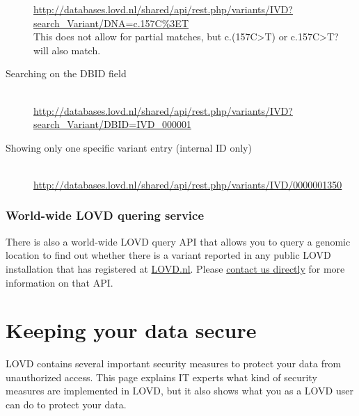 \documentclass[a4paper,oneside,openany,12pt]{memoir}
\begin{document}
\begin{description}
  \href{http://databases.lovd.nl/shared/api/rest.php/variants/IVD?search_Variant/DNA=c.157C\%3ET}
       {http://databases.lovd.nl/shared/api/rest.php/variants/IVD?\\
       \phantom{..........}search\_Variant/DNA=c.157C\%3ET}\\
       This does not allow for partial matches, but c.(157C>T) or c.157C>T? will also match.
  \item[Searching on the DBID field]\hfill \\
  \href{http://databases.lovd.nl/shared/api/rest.php/variants/IVD?search_Variant/DBID=IVD_000001}
       {http://databases.lovd.nl/shared/api/rest.php/variants/IVD?\\
       \phantom{..........}search\_Variant/DBID=IVD\_000001}
  \item[Showing only one specific variant entry (internal ID only)]\hfill \\
  \href{http://databases.lovd.nl/shared/api/rest.php/variants/IVD/0000001350}
       {http://databases.lovd.nl/shared/api/rest.php/variants/IVD/0000001350}
\end{description}



\subsection{World-wide LOVD quering service}
There is also a world-wide LOVD query API that allows you to query a genomic location to find out
 whether there is a variant reported in any public LOVD installation that has registered at
 \href{http://lovd.nl/2.0/index_list.php}{LOVD.nl}.
Please \href{http://www.lovd.nl/3.0/contact}{contact us directly} for more information on that API.










\hypertarget{chap:security}{}
\chapter{Keeping your data secure}
LOVD contains several important security measures to protect your data from unauthorized access.
This page explains IT experts what kind of security measures are implemented in LOVD, but it also shows what you as a LOVD user can do to protect your data.
\end{document}
